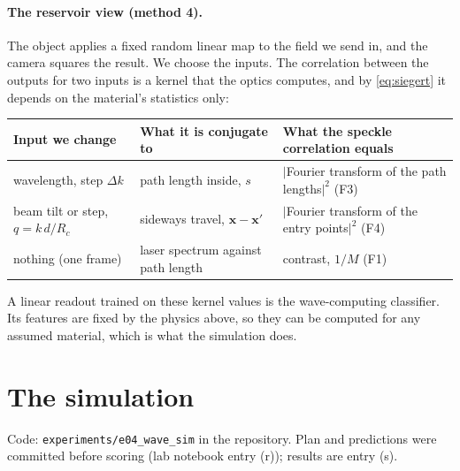 \documentclass[11pt]{article}
\begin{document}
\paragraph{The reservoir view (method 4).} The object applies a fixed random linear map to the field we send in, and
the camera squares the result. We choose the inputs. The correlation between the outputs for two inputs is a kernel
that the optics computes, and by \eqref{eq:siegert} it depends on the material's statistics only:
\begin{center}
\begin{tabular}{lll}
\toprule
Input we change & What it is conjugate to & What the speckle correlation equals\\
\midrule
wavelength, step $\Delta k$ & path length inside, $s$ & $|$Fourier transform of the path lengths$|^2$ (F3)\\
beam tilt or step, $q=k\,d/R_c$ & sideways travel, $\mathbf{x}-\mathbf{x}'$ & $|$Fourier transform of the entry points$|^2$ (F4)\\
nothing (one frame) & laser spectrum against path length & contrast, $1/M$ (F1)\\
\bottomrule
\end{tabular}
\end{center}
A linear readout trained on these kernel values is the wave-computing classifier. Its features are fixed by the
physics above, so they can be computed for any assumed material, which is what the simulation does.

\section{The simulation}\label{sec:sim}

Code: \texttt{experiments/e04\_wave\_sim} in the repository. Plan and predictions were committed before scoring (lab
notebook entry (r)); results are entry (s).
\end{document}
